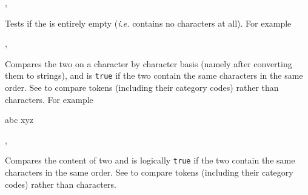 \documentclass[oneside]{book}
\begin{document}
\begin{function}{\StrVarIfEmpty,\StrVarIfEmptyTF}
\begin{syntax}
 
   
\end{syntax}
Tests if the  is entirely empty
(\emph{i.e.} contains no characters at all). For example
\begin{demohigh}
\StrSet {}
\StrVarIfEmptyTF {} {}
\StrClear \lTmpaStr
\StrVarIfEmptyTF {} {}
\end{demohigh}
\end{function}

\begin{function}{\StrIfEq,\StrIfEqTF}
\begin{syntax}
  
    
\end{syntax}
Compares the two  on a character by character
basis (namely after converting them to strings),
and is \texttt{true} if the two  contain the same
characters in the same order.
See  to compare
tokens (including their category codes) rather than characters.
For example
\begin{demohigh}
 {abc} {} {}
 {xyz} {} {}
\end{demohigh}
\end{function}

\begin{function}{\StrVarIfEq,\StrVarIfEqTF}
\begin{syntax}
  
    
\end{syntax}
Compares the content of two  and
is logically \texttt{true} if the two contain the same characters
in the same order.  See  to compare tokens
(including their category codes) rather than characters.
\begin{demohigh}
\StrSet {}
\StrSet {}
\StrSet {}
\StrVarIfEqTF \lTmpaStr {} {}
\StrVarIfEqTF \lTmpaStr {} {}
\end{demohigh}
\end{function}
\end{document}
